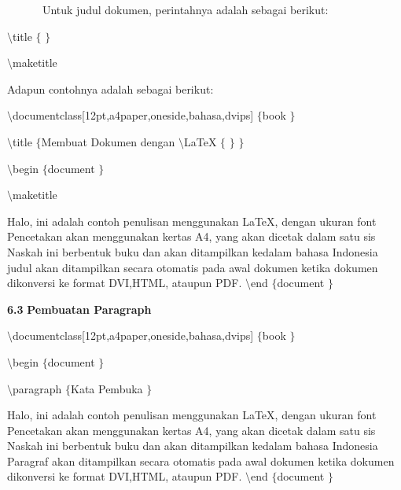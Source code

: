  \par
\textbf{~~~~~ }\textbf{ }Untuk judul dokumen, perintahnya adalah sebagai berikut:
 \par
{\fontsize{10pt}{10pt}\selectfont  $  \setminus  $title $  \{  $ $  \}  $}
 \par
{\fontsize{10pt}{10pt}\selectfont  $  \setminus  $maketitle}
 \par
\vspace{12pt}
Adapun contohnya adalah sebagai berikut:
 \par
{\fontsize{10pt}{10pt}\selectfont  $  \setminus  $documentclass[12pt,a4paper,oneside,bahasa,dvips] $  \{  $book $  \}  $}
 \par
{\fontsize{10pt}{10pt}\selectfont  $  \setminus  $title $  \{  $Membuat Dokumen dengan  $  \setminus  $LaTeX $  \{  $ $  \}  $ $  \}  $}
 \par
{\fontsize{10pt}{10pt}\selectfont  $  \setminus  $begin $  \{  $document $  \}  $}
 \par
{\fontsize{10pt}{10pt}\selectfont  $  \setminus  $maketitle}
 \par
\vspace{10pt}
{\fontsize{10pt}{10pt}\selectfont Halo, ini adalah contoh penulisan menggunakan LaTeX, dengan ukuran font Pencetakan akan menggunakan kertas A4, yang akan dicetak dalam satu sis Naskah ini berbentuk buku dan akan ditampilkan kedalam bahasa Indonesia judul akan ditampilkan secara otomatis pada awal dokumen ketika dokumen dikonversi ke format DVI,HTML, ataupun PDF.  $  \setminus  $end $  \{  $document $  \}  $} \par
\vspace{12pt}
\textbf{6.3 }\textbf{Pembuatan Paragraph} \par
{\fontsize{10pt}{10pt}\selectfont  $  \setminus  $documentclass[12pt,a4paper,oneside,bahasa,dvips] $  \{  $book $  \}  $} \par
{\fontsize{10pt}{10pt}\selectfont  $  \setminus  $begin $  \{  $document $  \}  $} \par
{\fontsize{10pt}{10pt}\selectfont  $  \setminus  $paragraph $  \{  $Kata Pembuka $  \}  $} \par
\vspace{9pt}
{\fontsize{10pt}{10pt}\selectfont Halo, ini adalah contoh penulisan menggunakan LaTeX, dengan ukuran font Pencetakan akan menggunakan kertas A4, yang akan dicetak dalam satu sis Naskah ini berbentuk buku dan akan ditampilkan kedalam bahasa Indonesia Paragraf akan ditampilkan secara otomatis pada awal dokumen ketika dokumen dikonversi ke format DVI,HTML, ataupun PDF.  $  \setminus  $end $  \{  $document $  \}  $} \par

